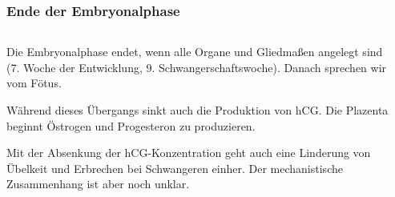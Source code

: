 \documentclass{beamer}
\begin{document}
    





\begin{frame}
\frametitle{Ende der Embryonalphase}

\begin{columns}[c]

\begin{column}{5cm}

Die Embryonalphase endet, wenn alle Organe und Gliedmaßen angelegt sind (7. Woche der Entwicklung, 9. Schwangerschaftswoche). Danach sprechen wir vom Fötus.  

\pause

Während dieses Übergangs sinkt auch die Produktion von hCG. Die Plazenta beginnt Östrogen und Progesteron zu produzieren. 


\pause

Mit der Absenkung der hCG-Konzentration geht auch eine Linderung von Übelkeit und Erbrechen bei Schwangeren einher. Der mechanistische Zusammenhang ist aber noch unklar.


\end{column}

\begin{column}{5cm}


\end{column}
\end{columns}
\end{frame}
\end{document}
